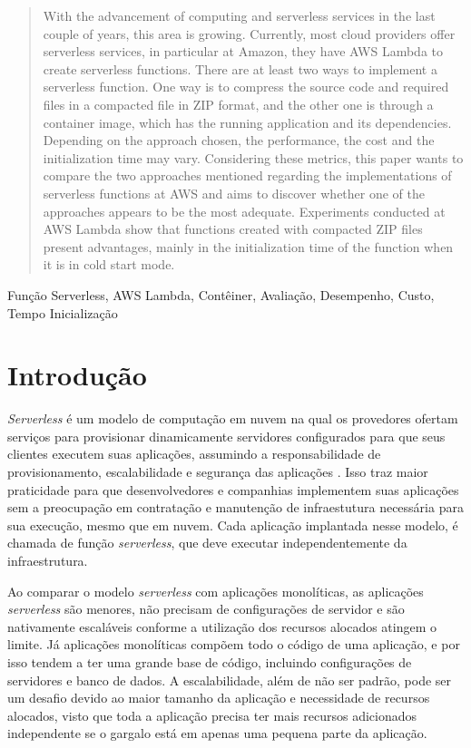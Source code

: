 \documentclass[conference]{IEEEtran}
\renewcommand{\abstractname}{Resumo}
\begin{document}
\renewcommand{\abstractname}{Abstract}
\begin{abstract}
With the advancement of computing and serverless services in the last couple of years, this area is growing. Currently, most cloud providers offer serverless services, in particular at Amazon, they have AWS Lambda to create serverless functions. There are at least two ways to implement a serverless function. One way is to compress the source code and required files in a compacted file in ZIP format, and the other one is through a container image, which has the running application and its dependencies. Depending on the approach chosen, the performance, the cost and the initialization time may vary. Considering these metrics, this paper wants to compare the two approaches mentioned regarding the implementations of serverless functions at AWS and aims to discover whether one of the approaches appears to be the most adequate. Experiments conducted at AWS Lambda show that functions created with compacted ZIP files present advantages, mainly in the initialization time of the function when it is in cold start mode.

\end{abstract}

\begin{IEEEkeywords}
Função Serverless, AWS Lambda, Contêiner, Avaliação, Desempenho, Custo, Tempo Inicialização
\end{IEEEkeywords}


\section{Introdução}
\label{sec:Intro}

\textit{Serverless} é um modelo de computação em nuvem na qual os provedores ofertam serviços para provisionar  dinamicamente servidores configurados para que seus clientes executem suas aplicações, assumindo a responsabilidade de provisionamento, escalabilidade e segurança das aplicações \cite{Nupponen_2020_serverless_what_it_is}.
Isso traz maior praticidade para que desenvolvedores e companhias implementem suas aplicações sem a preocupação em contratação e manutenção de infraestutura necessária para sua execução, mesmo que em nuvem. 
Cada aplicação implantada nesse modelo, é chamada de função \textit{serverless}, que deve executar independentemente da infraestrutura.

Ao comparar o modelo \textit{serverless} com aplicações monolíticas, as aplicações \textit{serverless} são menores, não precisam de configurações de servidor e são nativamente escaláveis conforme a utilização dos recursos alocados atingem o limite. Já aplicações monolíticas compõem todo o código de uma aplicação, e por isso tendem a ter uma grande base de código, incluindo configurações de servidores e banco de dados. A escalabilidade, além de não ser padrão, pode ser um desafio devido ao maior tamanho da aplicação e necessidade de recursos alocados, visto que toda a aplicação precisa ter mais recursos adicionados independente se o gargalo está em apenas uma pequena parte da aplicação.
\end{document}

